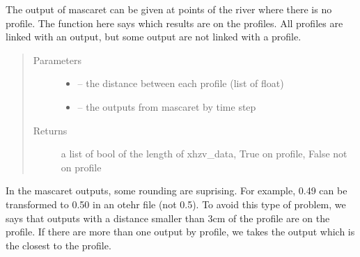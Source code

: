 \documentclass[letterpaper,10pt,english]{sphinxmanual}
\begin{document}

\begin{fulllineitems}
\label{\detokenize{index:src.mascaret.is_this_res_on_the_profile}}
The output of mascaret can be given at points of the river where there is no profile.
The function here says which results are on the profiles. All profiles are linked with an output, but some output
are not linked with a profile.
\begin{quote}\begin{description}
\item[{Parameters}] \leavevmode\begin{itemize}
\item {} 
 -- the distance between each profile (list of float)

\item {} 
 -- the outputs from mascaret by time step

\end{itemize}

\item[{Returns}] \leavevmode
a list of bool of the length of xhzv\_data, True on profile, False not on profile

\end{description}\end{quote}


In the mascaret outputs, some rounding are suprising. For example, 0.49 can be transformed to 0.50 in an otehr file
(not 0.5). To avoid this type of problem, we says that outputs with a distance smaller than 3cm of the profile are
on the profile. If there are more than one output by profile, we takes the output which is the closest to the
profile.

\end{fulllineitems}

\end{document}
